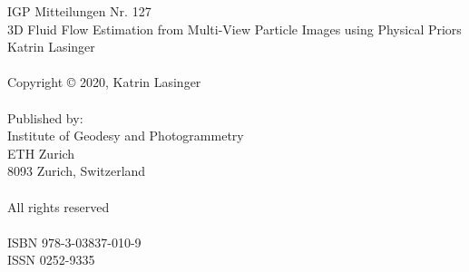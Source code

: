 
\newpage
\thispagestyle{empty}
\vspace*{6in}
\noindent
IGP Mitteilungen Nr. 127\\
3D Fluid Flow Estimation from Multi-View Particle Images using Physical Priors\\
Katrin Lasinger\\
\\
Copyright \copyright{} 2020, Katrin Lasinger\\
\\ 
Published by:\\
Institute of Geodesy and Photogrammetry\\
ETH Zurich\\
8093 Zurich, Switzerland\\
\\ 
All rights reserved\\
\\ 
ISBN 978-3-03837-010-9\\
ISSN 0252-9335\\
\mbox{}